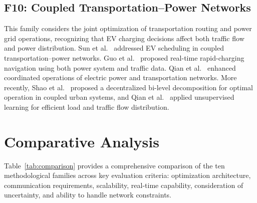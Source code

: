 \documentclass[review]{elsarticle}
\begin{document}
\subsection{F10: Coupled Transportation--Power Networks}\label{sec:f10}

\hspace{0.5cm}This family considers the joint optimization of transportation routing and power grid operations, recognizing that EV charging decisions affect both traffic flow and power distribution. Sun et al.~\cite{sun2019ev} addressed EV scheduling in coupled transportation--power networks. Guo et al.~\cite{guo2014rapid} proposed real-time rapid-charging navigation using both power system and traffic data. Qian et al.~\cite{qian2020enhanced} enhanced coordinated operations of electric power and transportation networks. More recently, Shao et al.~\cite{shao2024decentralized} proposed a decentralized bi-level decomposition for optimal operation in coupled urban systems, and Qian et al.~\cite{qian2025unsupervised} applied unsupervised learning for efficient load and traffic flow distribution.



\section{Comparative Analysis}\label{sec:comparison}

\hspace{0.5cm}Table~\ref{tab:comparison} provides a comprehensive comparison of the ten methodological families across key evaluation criteria: optimization architecture, communication requirements, scalability, real-time capability, consideration of uncertainty, and ability to handle network constraints.
\end{document}
